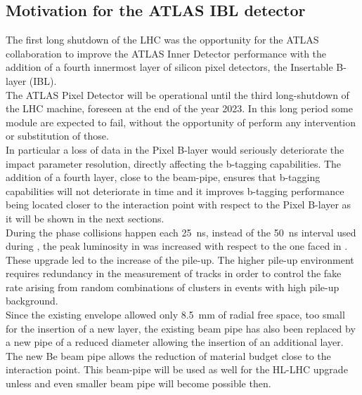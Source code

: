 \subsection{Motivation for the ATLAS IBL detector}
The first long shutdown of the LHC was the opportunity for the ATLAS collaboration to improve the ATLAS Inner Detector performance with the addition of a fourth innermost layer of silicon pixel detectors, the Insertable B-layer (IBL).\\
The ATLAS Pixel Detector will be operational until the third long-shutdown of the LHC machine, foreseen at the end of the year 2023. In this long period some module are expected to fail, without the opportunity of perform any intervention or substitution of those.\\
In particular a loss of data in the Pixel B-layer would seriously deteriorate the impact parameter resolution, directly affecting the b-tagging capabilities. The addition of a fourth layer, close to the beam-pipe, ensures that b-tagging capabilities will not deteriorate in time and it improves b-tagging performance being located closer to the interaction point with respect to the Pixel B-layer as it will be shown in the next sections.\\
During the \runtwo phase collisions happen each \SI{25}{\nano\second}, instead of the \SI{50}{\nano\second} interval used during \runone, the peak luminosity in \runtwo was increased with respect to the one faced in \runone. These upgrade led to the increase of the pile-up. The higher pile-up environment requires redundancy in the measurement of tracks in order to control the fake rate arising from random combinations of clusters in events with high pile-up background.\\
Since the existing envelope allowed only \SI{8.5}{\milli\meter} of radial free space, too small for the insertion of a new layer, the existing  beam pipe has also been replaced by a new pipe of a reduced diameter allowing the insertion of an additional layer. The new Be beam pipe allows the reduction of material budget close to the interaction point. This beam-pipe will be used as well for the HL-LHC upgrade unless and even smaller beam pipe will become possible then.

